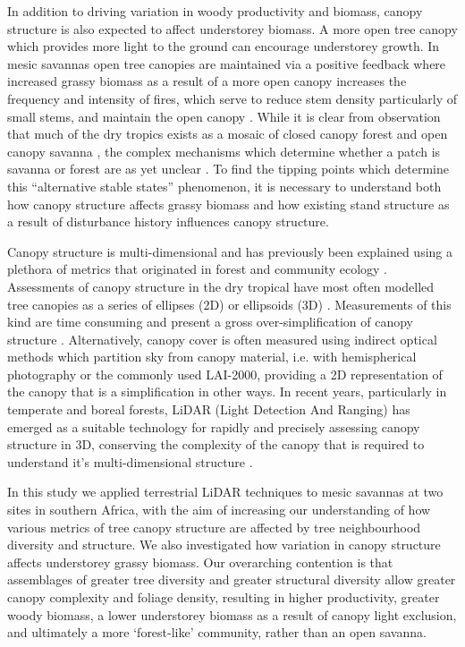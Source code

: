 \documentclass[11pt,a4paper]{article}
\begin{document}
In addition to driving variation in woody productivity and biomass, canopy structure is also expected to affect understorey biomass. A more open tree canopy which provides more light to the ground can encourage understorey growth. In mesic savannas open tree canopies are maintained via a positive feedback where increased grassy biomass as a result of a more open canopy increases the frequency and intensity of fires, which serve to reduce stem density particularly of small stems, and maintain the open canopy \citep{}. While it is clear from observation that much of the dry tropics exists as a mosaic of closed canopy forest and open canopy savanna \citep{}, the complex mechanisms which determine whether a patch is savanna or forest are as yet unclear \cite{}. To find the tipping points which determine this ``alternative stable states'' phenomenon, it is necessary to understand both how canopy structure affects grassy biomass and how existing stand structure as a result of disturbance history influences canopy structure. 

Canopy structure is multi-dimensional and has previously been explained using a plethora of metrics that originated in forest and community ecology \citep{}. Assessments of canopy structure in the dry tropical have most often modelled tree canopies as a series of ellipses (2D) or ellipsoids (3D) \citep{}. Measurements of this kind are time consuming and present a gross over-simplification of canopy structure \citep{}. Alternatively, canopy cover is often measured using indirect optical methods which partition sky from canopy material, i.e. with hemispherical photography or the commonly used LAI-2000, providing a 2D representation of the canopy that is a simplification in other ways. In recent years, particularly in temperate and boreal forests, LiDAR (Light Detection And Ranging) has emerged as a suitable technology for rapidly and precisely assessing canopy structure in 3D, conserving the complexity of the canopy that is required to understand it's multi-dimensional structure \citep{}.

In this study we applied terrestrial LiDAR techniques to mesic savannas at two sites in southern Africa, with the aim of increasing our understanding of how various metrics of tree canopy structure are affected by tree neighbourhood diversity and structure. We also investigated how variation in canopy structure affects understorey grassy biomass. Our overarching contention is that assemblages of greater tree diversity and greater structural diversity allow greater canopy complexity and foliage density, resulting in higher productivity, greater woody biomass, a lower understorey biomass as a result of canopy light exclusion, and ultimately a more `forest-like' community, rather than an open savanna.
\end{document}
